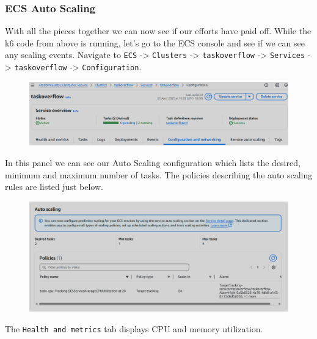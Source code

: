 \documentclass{csse4400}
\begin{document}
\subsubsection{ECS Auto Scaling}

With all the pieces together we can now see if our efforts have paid off.
While the k6 code from above is running, let's go to the ECS console and see if we can see any scaling events.
Navigate to \texttt{ECS} -> \texttt{Clusters} -> \texttt{taskoverflow} -> \texttt{Services} -> \texttt{taskoverflow} -> \texttt{Configuration}.

\begin{figure}[H]
  \begin{center}
    \includegraphics[width=\textwidth]{images/ecs-panel}
  \end{center}
\end{figure}

In this panel we can see our Auto Scaling configuration which lists the desired,
minimum and maximum number of tasks.
The policies describing the auto scaling rules are listed just below.

\begin{figure}[H]
  \begin{center}
    \includegraphics[width=\textwidth]{images/ecs-panel-auto-scaling-policies}
  \end{center}
\end{figure}

The \texttt{Health and metrics} tab displays CPU and memory utilization.
\end{document}
